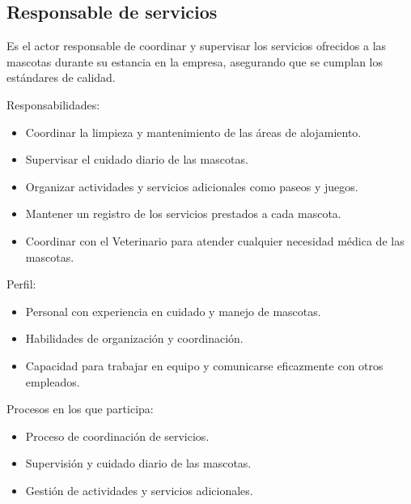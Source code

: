 \begin{Usuario}{\hypertarget{ResposableServicios}{\subsection{Responsable de servicios}}}{
			Es el actor responsable de coordinar y supervisar los servicios ofrecidos a las mascotas durante su estancia en la empresa, asegurando que se cumplan los estándares de calidad.
		}
		\item[Responsabilidades:] \cdtEmpty
		\begin{itemize}
			\item Coordinar la limpieza y mantenimiento de las áreas de alojamiento.
\item Supervisar el cuidado diario de las mascotas.
\item Organizar actividades y servicios adicionales como paseos y juegos.
\item Mantener un registro de los servicios prestados a cada mascota.
\item Coordinar con el Veterinario para atender cualquier necesidad médica de las mascotas.
		\end{itemize}
		
		\item[Perfil:] \cdtEmpty
		\begin{itemize}
			\item Personal con experiencia en cuidado y manejo de mascotas.
		\item Habilidades de organización y coordinación.
		\item Capacidad para trabajar en equipo y comunicarse eficazmente con otros empleados.
		\end{itemize}
		\item[Procesos en los que participa:] \cdtEmpty
		\begin{itemize}
			\item Proceso de coordinación de servicios.
		\item Supervisión y cuidado diario de las mascotas.
		\item Gestión de actividades y servicios adicionales.
		\end{itemize}
	\end{Usuario}

